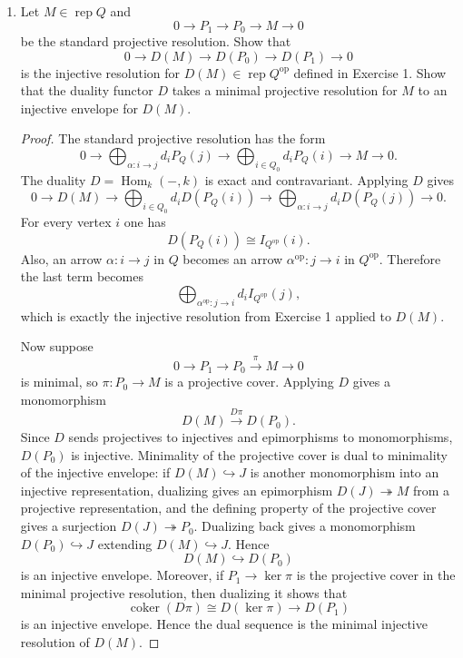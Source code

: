 \documentclass[11pt, a4paper]{article}
\newcommand{\rep}{\operatorname{rep}}
\newcommand{\Hom}{\operatorname{Hom}}
\begin{document}
\begin{enumerate}[leftmargin=*, label=\textbf{\arabic*.}]
\item Let $M\in\rep Q$ and
\[
0\longrightarrow P_1\longrightarrow P_0\longrightarrow M\longrightarrow 0
\]
be the standard projective resolution. Show that
\[
0\longrightarrow D(M)\longrightarrow D(P_0)\longrightarrow D(P_1)\longrightarrow 0
\]
is the injective resolution for $D(M)\in\rep Q^{\operatorname{op}}$ defined in Exercise 1. Show that the duality functor $D$ takes a minimal projective resolution for $M$ to an injective envelope for $D(M)$.

\begin{proof}
The standard projective resolution has the form
\[
0\longrightarrow
\bigoplus_{\alpha:i\to j} d_iP_Q(j)
\longrightarrow
\bigoplus_{i\in Q_0}d_iP_Q(i)
\longrightarrow M\longrightarrow 0.
\]
The duality $D=\Hom_k(-,k)$ is exact and contravariant. Applying $D$ gives
\[
0\longrightarrow D(M)\longrightarrow
\bigoplus_{i\in Q_0}d_iD(P_Q(i))
\longrightarrow
\bigoplus_{\alpha:i\to j}d_iD(P_Q(j))
\longrightarrow 0.
\]
For every vertex $i$ one has
\[
D(P_Q(i))\cong I_{Q^{\operatorname{op}}}(i).
\]
Also, an arrow $\alpha:i\to j$ in $Q$ becomes an arrow $\alpha^{\operatorname{op}}:j\to i$ in $Q^{\operatorname{op}}$. Therefore the last term becomes
\[
\bigoplus_{\alpha^{\operatorname{op}}:j\to i}d_iI_{Q^{\operatorname{op}}}(j),
\]
which is exactly the injective resolution from Exercise 1 applied to $D(M)$.

Now suppose
\[
0\to P_1\to P_0\xrightarrow{\pi}M\to 0
\]
is minimal, so $\pi:P_0\to M$ is a projective cover. Applying $D$ gives a monomorphism
\[
D(M)\xrightarrow{D\pi}D(P_0).
\]
Since $D$ sends projectives to injectives and epimorphisms to monomorphisms, $D(P_0)$ is injective. Minimality of the projective cover is dual to minimality of the injective envelope: if $D(M)\hookrightarrow J$ is another monomorphism into an injective representation, dualizing gives an epimorphism $D(J)\twoheadrightarrow M$ from a projective representation, and the defining property of the projective cover gives a surjection $D(J)\twoheadrightarrow P_0$. Dualizing back gives a monomorphism $D(P_0)\hookrightarrow J$ extending $D(M)\hookrightarrow J$. Hence
\[
D(M)\hookrightarrow D(P_0)
\]
is an injective envelope.
Moreover, if $P_1\to\ker\pi$ is the projective cover in the minimal projective
resolution, then dualizing it shows that
\[
\operatorname{coker}(D\pi)\cong D(\ker\pi)\longrightarrow D(P_1)
\]
is an injective envelope. Hence the dual sequence is the minimal injective
resolution of $D(M)$.
\end{proof}


\end{enumerate}
\end{document}
